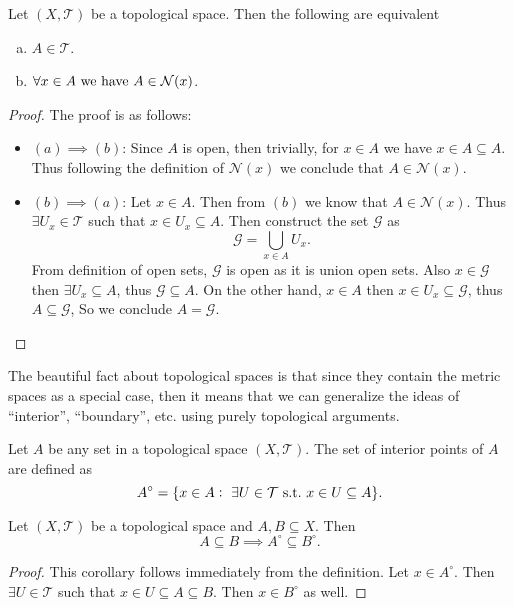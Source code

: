 \begin{lemma}{}
	Let $(X, \mathcal{T})$ be a topological space. Then the following are equivalent
	\begin{enumerate}[(a)]
		\item $A \in \mathcal{T}$.
		\item $\forall x\in A \ \text{we have}\  A \in \mathcal{N}(x)$.
	\end{enumerate}
\end{lemma}
\begin{proof} The proof is as follows: 
	\begin{itemize}
		\item $(a) \implies (b)$: Since $A$ is open, then trivially, for $x\in A$ we have $x\in A \subseteq A$. Thus following the definition of $\mathcal{N}(x)$ we conclude that $A \in  \mathcal{N}(x)$.
		\item $(b) \implies (a)$: Let $x \in A$. Then from $(b)$ we know that $A \in  \mathcal{N}(x)$. Thus $\exists U_x \in \mathcal{T}$ such that $x\in U_x \subseteq A$. Then construct the set $\mathcal{G}$ as 
		\[ \mathcal{G} = \bigcup_{x\in A} U_x. \]
		From definition of open sets, $\mathcal{G}$ is open as it is union open sets. Also $x \in \mathcal{G}$ then $\exists U_x \subseteq A$, thus $\mathcal{G} \subseteq A$. On the other hand, $x\in A$ then $x\in U_x \subseteq \mathcal{G}$, thus $A \subseteq \mathcal{G}$, So we conclude $A = \mathcal{G}$.
	\end{itemize}
\end{proof}

The beautiful fact about topological spaces is that since they contain the metric spaces as a special case, then it means that we can generalize the ideas of ``interior'', ``boundary'', etc. using purely topological arguments.

\begin{definition}
	Let $A$ be any set in a topological space $(X,\mathcal{T})$. The set of interior points of $A$ are defined as
	\[ A^{\circ} = \{ x\in A:\ \exists U\in \mathcal{T} \st x\in U \subseteq A \}. \]
\end{definition}

\begin{corollary}
	Let $(X,\mathcal{T})$ be a topological space and $A,B \subseteq X$. Then 
	\[ A \subseteq B \implies A^\circ \subseteq B^\circ. \]
\end{corollary}
\begin{proof}
	This corollary follows immediately from the definition. Let $x\in A^\circ$. Then $\exists U \in \mathcal{T}$ such that $x\in U \subseteq A \subseteq B$. Then $x \in B^\circ$ as well.   
\end{proof}

